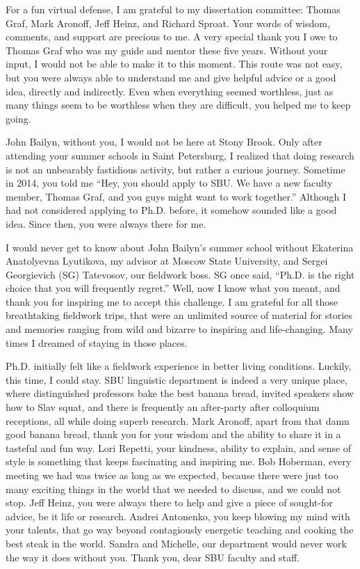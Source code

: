 {\small 
For a fun virtual defense, I am grateful to my dissertation committee: Thomas Graf, Mark Aronoff, Jeff Heinz, and Richard Sproat.
Your words of wisdom, comments, and support are precious to me.
A very special thank you I owe to Thomas Graf who was my guide and mentor these five years.
Without your input, I would not be able to make it to this moment.
This route was not easy, but you were always able to understand me and give helpful advice or a good idea, directly and indirectly.
Even when everything seemed worthless, just as many things seem to be worthless when they are difficult, you helped me to keep going.


John Bailyn, without you, I would not be here at Stony Brook.
Only after attending your summer schools in Saint Petersburg, I realized that doing research is not an unbearably fastidious activity, but rather a curious journey.
Sometime in 2014, you told me ``Hey, you should apply to SBU.
We have a new faculty member, Thomas Graf, and you guys might want to work together.''
Although I had not considered applying to Ph.D. before, it somehow sounded like a good idea.
Since then, you were always there for me.

I would never get to know about John Bailyn's summer school without Ekaterina Anatolyevna Lyutikova, my advisor at Moscow State University, and Sergei Georgievich (SG) Tatevosov, our fieldwork boss.
SG once said, ``Ph.D. is the right choice that you will frequently regret.''
Well, now I know what you meant, and thank you for inspiring me to accept this challenge.
I am grateful for all those breathtaking fieldwork trips, that were an unlimited source of material for stories and memories ranging from wild and bizarre to inspiring and life-changing.
Many times I dreamed of staying in those places.

Ph.D. initially felt like a fieldwork experience in better living conditions.
Luckily, this time, I could stay.
SBU linguistic department is indeed a very unique place, where distinguished professors bake the best banana bread, invited speakers show how to Slav squat, and there is frequently an after-party after colloquium receptions, all while doing superb research.
Mark Aronoff, apart from that damn good banana bread, thank you for your wisdom and the ability to share it in a tasteful and fun way.
Lori Repetti, your kindness, ability to explain, and sense of style is something that keeps fascinating and inspiring me.
Bob Hoberman, every meeting we had was twice as long as we expected, because there were just too many exciting things in the world that we needed to discuss, and we could not stop.
Jeff Heinz, you were always there to help and give a piece of sought-for advice, be it life or research.
Andrei Antonenko, you keep blowing my mind with your talents, that go way beyond contagiously energetic teaching and cooking the best steak in the world.
Sandra and Michelle, our department would never work the way it does without you.
Thank you, dear SBU faculty and staff.

}
